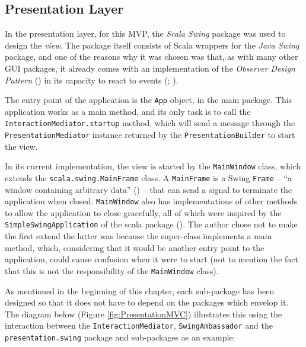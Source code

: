 \subsection{Presentation Layer} \label{sec:Implementation.Presentation}
In the presentation layer, for this MVP, the \emph{Scala Swing} package was
used to design the \emph{view}. The package itself consists of Scala wrappers
for the \emph{Java Swing} package, and one of the reasons why it was chosen was
that, as with many other GUI packages, it already comes with an implementation
of the \emph{Observer Design Pattern} (\cite[][p.~293]{gamma1995design}) in its
capacity to react to events (\cite[][p.~5]{maier2009scala};
\cite[][Ch.~9,~Location~3731]{nikolov2016scala}).

The entry point of the application is the \texttt{App} object, in the main
package. This application works as a main method, and its only task is to
call the \texttt{InteractionMediator.startup} method, which will send a
message through the \texttt{PresentationMediator} instance returned by the
\texttt{PresentationBuilder} to start the view.

\begin{sloppypar}
  In its current implementation, the view is started by the \texttt{MainWindow}
  class, which extends the \texttt{scala.swing.MainFrame} class. A
  \texttt{MainFrame} is a Swing \texttt{Frame} -- ``a window containing
  arbitrary data'' (\cite[][Ch.~34,~Section~34.1]{odersky2016scala}) -- that
  can send a signal to terminate the application when closed.
  \texttt{MainWindow} also has implementations of other methods to allow the
  application to close gracefully, all of which were inspired by the
  \texttt{SimpleSwingApplication} of the scala package
  (\cite[][p.~2~\&~3]{maier2009scala}). The author chose not to make the first
  extend the latter was because the super-class implements a main method,
  which, considering that it would be another entry point to the application,
  could cause confusion when it were to start (not to mention the fact that
  this is not the responsibility of the \texttt{MainWindow} class).
\end{sloppypar}


As mentioned in the beginning of this chapter, each sub-package has been
designed so that it does not have to depend on the packages which envelop it.
The diagram below (Figure \ref{fig:PresentationMVC}) illustrates this using the
interaction between the \texttt{InteractionMediator}, \texttt{SwingAmbassador}
and the \texttt{presentation.swing} package and sub-packages as an example:

